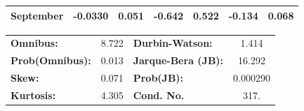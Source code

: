 \documentclass[a4paper,11pt]{article}
\begin{document}
\begin{center}
\begin{tabular}{lcccccc}
\textbf{September}             &      -0.0330  &        0.051     &    -0.642  &         0.522        &       -0.134    &        0.068     \\
\bottomrule
\end{tabular}
\begin{tabular}{lclc}
\textbf{Omnibus:}       &  8.722 & \textbf{  Durbin-Watson:     } &    1.414  \\
\textbf{Prob(Omnibus):} &  0.013 & \textbf{  Jarque-Bera (JB):  } &   16.292  \\
\textbf{Skew:}          &  0.071 & \textbf{  Prob(JB):          } & 0.000290  \\
\textbf{Kurtosis:}      &  4.305 & \textbf{  Cond. No.          } &     317.  \\
\bottomrule
\end{tabular}
\end{center}
\newpage
\end{document}
